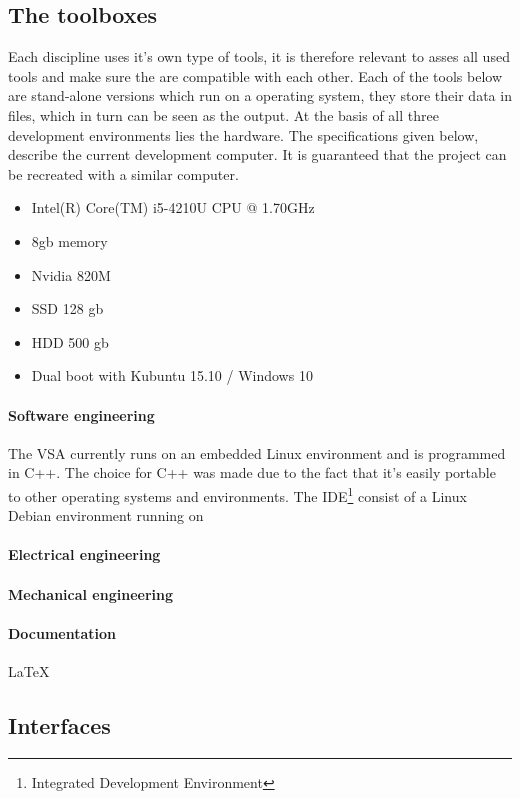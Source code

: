 \documentclass[fleqn,10pt]{SelfArx} %
\begin{document}
\subsection{The toolboxes}\label{sec:Toolboxes}
Each discipline uses it's own type of tools, it is therefore relevant to asses all used tools and make sure the are compatible with each other. Each of the tools below are stand-alone versions which run on a operating system, they store their data in files, which in turn can be seen as the output. At the basis of all three development environments lies the hardware. The specifications given below, describe the current development computer. It is guaranteed that the project can be recreated with a similar computer.
\begin{itemize}
	\itemsep0em
	\item Intel(R) Core(TM) i5-4210U CPU @ 1.70GHz
	\item 8gb memory
	\item Nvidia 820M
	\item SSD 128 gb
	\item HDD 500 gb
	\item Dual boot with Kubuntu 15.10 / Windows 10
\end{itemize}

\paragraph{Software engineering}
The VSA currently runs on an embedded Linux environment and is programmed in C++. The choice for C++ was made due to the fact that it's easily portable to other operating systems and environments. The IDE\footnote{Integrated Development Environment} consist of a Linux Debian environment running on 

\paragraph{Electrical engineering}

\paragraph{Mechanical engineering}

\paragraph{Documentation}
\LaTeX 


\subsection{Interfaces}\label{sec:Interfaces}
\end{document}
